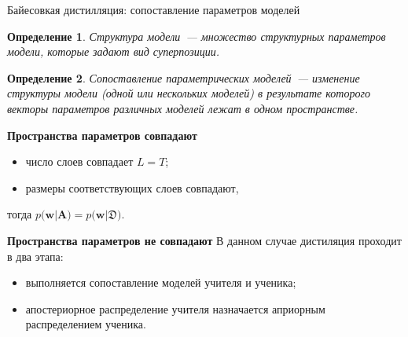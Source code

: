\documentclass[10pt,pdf,hyperref={unicode}]{beamer}
\newtheorem{rusdefinition}{Определение}
\begin{document}
\begin{frame}{Байесовкая дистилляция: сопоставление параметров моделей}
\begin{rusdefinition}
Структура модели~--- множество структурных параметров модели, которые задают вид суперпозиции.
\end{rusdefinition}

\begin{rusdefinition}
Сопоставление параметрических моделей~--- изменение структуры модели (одной или нескольких моделей) в результате которого векторы параметров различных моделей лежат в одном пространстве.
\end{rusdefinition}


\textbf{Пространства параметров совпадают}
\begin{itemize}
    \item число слоев совпадает $L=T$;
    \item размеры соответствующих слоев совпадают,
\end{itemize}
тогда $p\bigr(\mathbf{w}|\mathbf{A}\bigr) = p\bigr(\mathbf{w}|\mathfrak{D}\bigr)$.

\textbf{Пространства параметров не совпадают}
В данном случае дистиляция проходит в два этапа:
\begin{itemize}
    \item выполняется сопоставление моделей учителя и ученика;
    \item апостериорное распределение учителя назначается априорным распределением ученика.
\end{itemize}

\end{frame}
\end{document}
